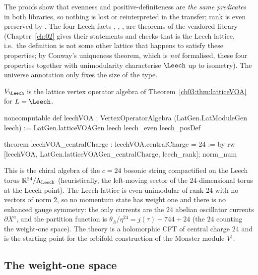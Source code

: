 \begin{dictionary}
The proofs  show that evenness and positive-definiteness are \emph{the same
predicates} in both libraries, so nothing is lost or reinterpreted in the transfer; rank is even
preserved by . The four Leech facts ,
, ,  are
theorems of the vendored library (Chapter~\ref{ch:02} gives their statements and checks that
 is the Leech lattice, i.e.\ the definition is not some other lattice that
happens to satisfy these properties; by Conway's uniqueness theorem, which is \emph{not}
formalised, these four properties together with unimodularity characterise $\Leech$ up to
isometry). The universe annotation  only fixes the size of the type.
\end{dictionary}

\begin{definition}\label{ch03:def:leechVOA}
$V_\Leech$ is the lattice vertex operator algebra of Theorem~\ref{ch03:thm:latticeVOA} for
$L=\Leech$.
\end{definition}
\begin{leancode}
noncomputable def leechVOA : VertexOperatorAlgebra (LatGen.LatModuleGen leech) :=
  LatGen.latticeVOAGen leech leech_even leech_posDef

theorem leechVOA_centralCharge : leechVOA.centralCharge = 24 := by
  rw [leechVOA, LatGen.latticeVOAGen_centralCharge, leech_rank]; norm_num
\end{leancode}

\begin{physics}
This is the chiral algebra of the $c=24$ bosonic string compactified on the Leech torus $\mathbb R^{24}/\Lambda_{\rm Leech}$ (heuristically, the left-moving sector of the $24$-dimensional torus at the Leech point). The Leech lattice is even unimodular of rank $24$ with no vectors of norm $2$, so no momentum state has weight one and there is no enhanced gauge symmetry: the only currents are the $24$ abelian oscillator currents $\partial X^a$, and the partition function is $\theta_\Lambda/\eta^{24}=j(\tau)-744+24$ (the $24$ counting the weight-one space). The theory is a holomorphic CFT of central charge $24$ and is the starting point for the orbifold construction of the Monster module $V^\natural$.
\end{physics}

\subsection{The weight-one space}

